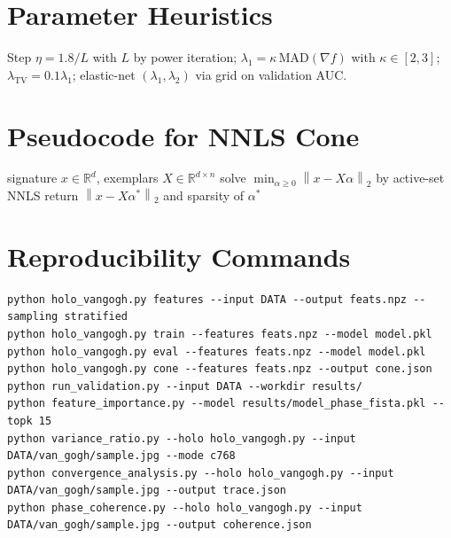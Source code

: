 \documentclass[11pt]{article}
\newcommand{\R}{\mathbb{R}}
\newcommand{\norm}[1]{\left\lVert #1 \right\rVert}
\begin{document}
\appendix
\section{Parameter Heuristics}
Step $\eta=1.8/L$ with $L$ by power iteration; $\lambda_1=\kappa\,\mathrm{MAD}(\nabla f)$ with $\kappa\in[2,3]$; $\lambda_{\mathrm{TV}}=0.1\lambda_1$; elastic-net $(\lambda_1,\lambda_2)$ via grid on validation AUC.

\section{Pseudocode for NNLS Cone}
\begin{algorithm}[H]
\caption{NNLS cone distance}
\begin{algorithmic}[1]
\Require signature $x\in\R^d$, exemplars $X\in\R^{d\times n}$
\State solve $\min_{\alpha\ge 0}\norm{x-X\alpha}_2$ by active-set NNLS
\State return $\norm{x-X\alpha^*}_2$ and sparsity of $\alpha^*$
\end{algorithmic}
\end{algorithm}

\section{Reproducibility Commands}
\begin{verbatim}
python holo_vangogh.py features --input DATA --output feats.npz --sampling stratified
python holo_vangogh.py train --features feats.npz --model model.pkl
python holo_vangogh.py eval --features feats.npz --model model.pkl
python holo_vangogh.py cone --features feats.npz --output cone.json
python run_validation.py --input DATA --workdir results/
python feature_importance.py --model results/model_phase_fista.pkl --topk 15
python variance_ratio.py --holo holo_vangogh.py --input DATA/van_gogh/sample.jpg --mode c768
python convergence_analysis.py --holo holo_vangogh.py --input DATA/van_gogh/sample.jpg --output trace.json
python phase_coherence.py --holo holo_vangogh.py --input DATA/van_gogh/sample.jpg --output coherence.json
\end{verbatim}
\end{document}
